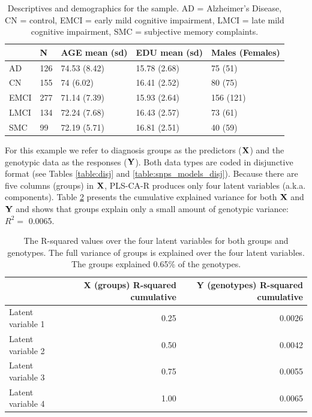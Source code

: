 \documentclass[12pt]{article}
\begin{document}
\begin{table}[!h]

\caption{\label{tab:sample_descriptives}\label{table:desctab} Descriptives and demographics for the sample. AD = Alzheimer's Disease, CN = control, EMCI = early mild cognitive impairment, LMCI = late mild cognitive impairment, SMC = subjective memory complaints.}
\centering
\begin{tabular}[t]{lllll}
\toprule
  & N & AGE mean (sd) & EDU mean (sd) & Males (Females)\\
\midrule
AD & 126 & 74.53 (8.42) & 15.78 (2.68) & 75 (51)\\
CN & 155 & 74 (6.02) & 16.41 (2.52) & 80 (75)\\
EMCI & 277 & 71.14 (7.39) & 15.93 (2.64) & 156 (121)\\
LMCI & 134 & 72.24 (7.68) & 16.43 (2.57) & 73 (61)\\
SMC & 99 & 72.19 (5.71) & 16.81 (2.51) & 40 (59)\\
\bottomrule
\end{tabular}
\end{table}

For this example we refer to diagnosis groups as the predictors
(\({\bf X}\)) and the genotypic data as the responses (\({\bf Y}\)).
Both data types are coded in disjunctive format (see Tables
\ref{table:disj} and \ref{table:snps_models_disj}). Because there are
five columns (groups) in \({\bf X}\), PLS-CA-R produces only four latent
variables (a.k.a. components). Table \ref{table:r2ex1} presents the
cumulative explained variance for both \({\bf X}\) and \({\bf Y}\) and
shows that groups explain only a small amount of genotypic variance:
\(R^2=\) 0.0065.

\begin{table}[!h]

\caption{\label{tab:unnamed-chunk-3}\label{table:r2ex1} The R-squared values over the four latent variables for both groups and genotypes. The full variance of groups is explained over the four latent variables. The groups explained 0.65\% of the genotypes.}
\centering
\begin{tabular}[t]{lrr}
\toprule
  & X (groups) R-squared cumulative & Y (genotypes) R-squared cumulative\\
\midrule
Latent variable 1 & 0.25 & 0.0026\\
Latent variable 2 & 0.50 & 0.0042\\
Latent variable 3 & 0.75 & 0.0055\\
Latent variable 4 & 1.00 & 0.0065\\
\bottomrule
\end{tabular}
\end{table}
\end{document}
